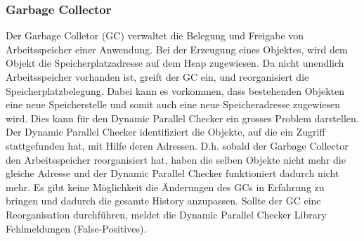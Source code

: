 \documentclass[10pt,a4paper]{article}
\begin{document}
\subsubsection{Garbage Collector}
\begin{flushleft}
Der Garbage Colletor (GC) verwaltet die Belegung und Freigabe von Arbeitsspeicher einer Anwendung. Bei der Erzeugung eines Objektes, wird dem Objekt die Speicherplatzadresse auf dem Heap zugewiesen. Da nicht unendlich Arbeitsspeicher vorhanden ist, greift der GC ein, und reorganisiert die Speicherplatzbelegung. Dabei kann es vorkommen, dass bestehenden Objekten eine neue Speicherstelle und somit auch eine neue Speicheradresse zugewiesen wird. Dies kann für den Dynamic Parallel Checker ein grosses Problem darstellen.\\
Der Dynamic Parallel Checker identifiziert die Objekte, auf die ein Zugriff stattgefunden hat, mit Hilfe deren Adressen. D.h. sobald der Garbage Collector den Arbeitsspeicher reorganisiert hat, haben die selben Objekte nicht mehr die gleiche Adresse und der Dynamic Parallel Checker funktioniert dadurch nicht mehr. Es gibt keine Möglichkeit die Änderungen des GCs in Erfahrung zu bringen und dadurch die gesamte History anzupassen. Sollte der GC eine Reorganisation durchführen, meldet die Dynamic Parallel Checker Library Fehlmeldungen (False-Positives).
\end{flushleft}
\end{document}
